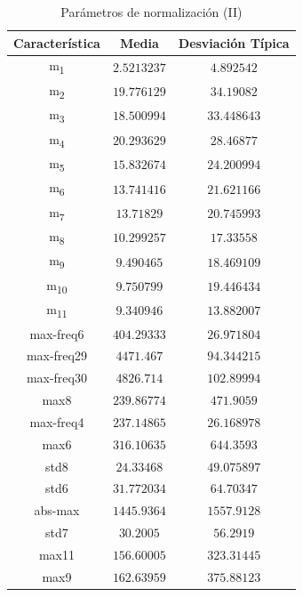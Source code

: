 \documentclass[12pt]{article}
\begin{document}
\begin{table}
	\caption{Parámetros de normalización (II)}
	\centering
		\begin{tabular}{||c c c||}
			\hline
			Característica & Media & Desviación Típica  \\ [0.5ex]
			\hline\hline
			m\textsubscript{1} & $2.5213237$ & $4.892542$ \\
			\hline
			m\textsubscript{2} & $19.776129$ & $34.19082$ \\
			\hline
			m\textsubscript{3} & $18.500994$ & $33.448643$ \\
			\hline
			m\textsubscript{4} & $20.293629$ & $28.46877$ \\
			\hline
			m\textsubscript{5} & $15.832674$ & $24.200994$ \\
			\hline
			m\textsubscript{6} & $13.741416$ & $21.621166$ \\
			\hline
			m\textsubscript{7} & $13.71829$ & $20.745993$ \\
			\hline
			m\textsubscript{8} & $10.299257$ & $17.33558$ \\
			\hline
			m\textsubscript{9} & $9.490465$ & $18.469109$ \\
			\hline
			m\textsubscript{10} & $9.750799$ & $19.446434$ \\
			\hline
			m\textsubscript{11} & $9.340946$ & $13.882007$ \\
			\hline
			max-freq6 & $404.29333$ & $26.971804$ \\
			\hline
			max-freq29 & $4471.467$ & $94.344215$ \\
			\hline
			max-freq30 & $4826.714$ & $102.89994$ \\
			\hline
			max8 & $239.86774$ & $471.9059$ \\
			\hline
			max-freq4 & $237.14865$ & $26.168978$ \\
			\hline
			max6 & $316.10635$ & $644.3593$ \\
			\hline
			std8 & $24.33468$ & $49.075897$ \\
			\hline
			std6 & $31.772034$ & $64.70347$ \\
			\hline
			abs-max & $1445.9364$ & $1557.9128$ \\
			\hline
			std7 & $30.2005$ & $56.2919$ \\
			\hline
			max11 & $156.60005$ & $323.31445$ \\
			\hline
			max9 & $162.63959$ & $375.88123$ \\
			\hline
		\end{tabular}
	\label{Tab:Features_5_2}
\end{table}
\end{document}
